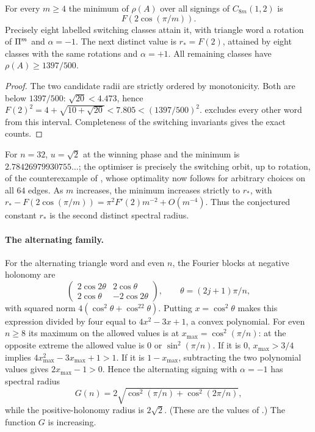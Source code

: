 \begin{theorem}\label{gra:thm:cycle8m}
For every $m\ge4$ the minimum of $\rho(A)$ over all signings of
$C_{8m}(1,2)$ is
\[
 F(2\cos(\pi/m)).
\]
Precisely eight labelled switching classes attain it, with triangle word
a rotation of $\Pi^m$ and $\alpha=-1$. The next distinct value is
$r_*=F(2)$, attained by eight classes with the same rotations and
$\alpha=+1$. All remaining classes have $\rho(A)\ge1397/500$.
\end{theorem}

\begin{proof}
The two candidate radii are strictly ordered by monotonicity. Both are
below $1397/500$: $\sqrt{20}<4.473$, hence
$F(2)^2=4+\sqrt{10+\sqrt{20}}<7.805<(1397/500)^2$.
 excludes every other word from this interval.
Completeness of the switching invariants gives the exact counts.
\end{proof}

For $n=32$, $u=\sqrt2$ at the winning phase and the minimum is
$2.78426979930755\ldots$; the optimiser is precisely the switching orbit,
up to rotation, of the counterexample of
\cite{Trureturing2026Refutation}, whose optimality now follows for
arbitrary choices on all $64$ edges. As $m$ increases, the minimum
increases strictly to $r_*$, with
$r_*-F(2\cos(\pi/m))=\pi^2F'(2)m^{-2}+O(m^{-4})$. Thus the conjectured
constant $r_*$ is the second distinct spectral radius.

\paragraph{The alternating family.}
For the alternating triangle word and even $n$, the Fourier blocks at
negative holonomy are
\[
 \begin{pmatrix}2\cos2\theta&2\cos\theta\\2\cos\theta&-2\cos2\theta
 \end{pmatrix},\qquad\theta=(2j+1)\pi/n,
\]
with squared norm $4(\cos^2\theta+\cos^22\theta)$. Putting
$x=\cos^2\theta$ makes this expression divided by four equal to
$4x^2-3x+1$, a convex polynomial. For even $n\ge8$ its maximum on the
allowed values is at $x_{\max}=\cos^2(\pi/n)$: at the opposite extreme the
allowed value is $0$ or $\sin^2(\pi/n)$. If it is $0$, $x_{\max}>3/4$
implies $4x_{\max}^2-3x_{\max}+1>1$. If it is $1-x_{\max}$, subtracting
the two polynomial values gives $2x_{\max}-1>0$. Hence the alternating
signing with $\alpha=-1$ has spectral radius
\begin{equation}\label{gra:eq:alternating}
 G(n)=2\sqrt{\cos^2(\pi/n)+\cos^2(2\pi/n)},
\end{equation}
while the positive-holonomy radius is $2\sqrt2$. (These are the values of
\cite[Proposition~25]{Suvagiya2026Parity}.) The function $G$ is
increasing.

